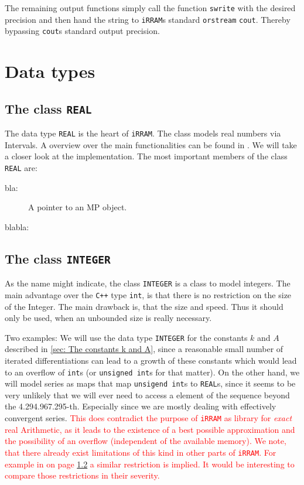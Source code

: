 \documentclass{article}
\newcommand{\irram}{\texttt{iRRAM}\xspace}
\newcommand{\irrams}{\texttt{iRRAM}s\xspace}
\newcommand{\cc}{\texttt{C++}\xspace}
\newcommand{\ir}[1]{\texttt{#1}}
\newcommand{\code}[1]{\texttt{#1}}
\newcommand{\temp}[1]{\textcolor{red}{#1}}
\begin{document}
The remaining output functions simply call the function \ir{swrite} with the desired precision and then hand the string to \irrams standard \ir{orstream} \ir{cout}. Thereby bypassing \ir{cout}s standard output precision.


\section{Data types}

\subsection{The class \ir{REAL}}

The data type \ir{REAL} is the heart of \irram. The class models real numbers via Intervals. A overview over the main functionalities can be found in \cite{}. We will take a closer look at the implementation. The most important members of the class \ir{REAL} are:
\begin{description}
\item[bla:] A pointer to an MP object.
\item[blabla:]
\end{description}

\subsection{The class \ir{INTEGER}}

As the name might indicate, the class \ir{INTEGER} is a class to model integers. The main advantage over the \cc type \code{int}, is that there is no restriction on the size of the Integer. The main drawback is, that the size and speed. Thus it should only be used, when an unbounded size is really necessary.

Two examples: We will use the data type \ir{INTEGER} for the constants $k$ and $A$ described in \cref{sec: The constants k and A}, since a reasonable small number of iterated differentiations can lead to a growth of these constants which would lead to an overflow of \code{int}s (or \code{unsigned int}s for that matter). On the other hand, we will model series as maps that map \code{unsigend int}s to \code{REAL}s, since it seems to be very unlikely that we will ever need to access a element of the sequence beyond the 4.294.967.295-th. Especially since we are mostly dealing with effectively convergent series. \temp{This does contradict the purpose of \irram as library for \emph{exact} real Arithmetic, as it leads to the existence of a best possible approximation and the possibility of an overflow (independent of the available memory). We note, that there already exist limitations of this kind in other parts of \irram. For example in \cite{} on page \ref{} a similar restriction is implied. It would be interesting to compare those restrictions in their severity.}
\end{document}

